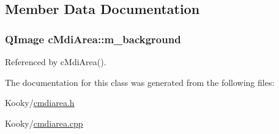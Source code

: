 \subsection{Member Data Documentation}
\subsubsection[{\texorpdfstring{m\+\_\+background}{m_background}}]{\setlength{\rightskip}{0pt plus 5cm}Q\+Image c\+Mdi\+Area\+::m\+\_\+background\hspace{0.3cm}{\ttfamily [private]}}\hypertarget{classc_mdi_area_a94875ece3a5f527abcad372d535f0c7f}{}\label{classc_mdi_area_a94875ece3a5f527abcad372d535f0c7f}


Referenced by c\+Mdi\+Area().



The documentation for this class was generated from the following files\+:\begin{DoxyCompactItemize}
\item 
Kooky/\hyperlink{cmdiarea_8h}{cmdiarea.\+h}\item 
Kooky/\hyperlink{cmdiarea_8cpp}{cmdiarea.\+cpp}\end{DoxyCompactItemize}
